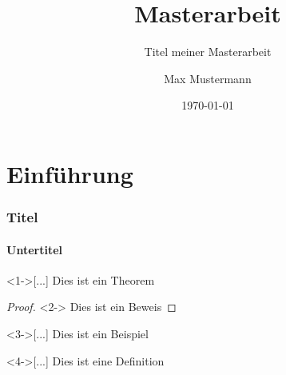 \documentclass{beamer}
\title{Masterarbeit}
\subtitle{Titel meiner Masterarbeit}
\author{Max Mustermann}
\date{\today}
\institute{Hochschule Musterstadt}
\begin{document}
	
\section{Einführung}

\begin{frame}
\frametitle{Titel}
\framesubtitle{Untertitel}

\begin{theorem}<1->[...]
Dies ist ein Theorem
\end{theorem}

\begin{proof}<2->
Dies ist ein Beweis
\end{proof}

\begin{example}<3->[...]
Dies ist ein Beispiel
\end{example}

\begin{definition}<4->[...]
Dies ist eine Definition
\end{definition}

\end{frame}
\end{document}
